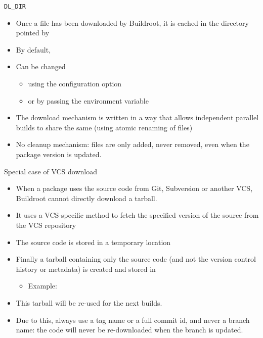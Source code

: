 \begin{frame}{{\tt DL\_DIR}}
  \begin{itemize}
  \item Once a file has been downloaded by Buildroot, it is cached in
    the directory pointed by 
  \item By default, 
  \item Can be changed
    \begin{itemize}
    \item using the  configuration option
    \item or by passing the  environment variable
    \end{itemize}
  \item The download mechanism is written in a way that allows
    independent parallel builds to share the same  (using
    atomic renaming of files)
  \item No cleanup mechanism: files are only added, never removed,
    even when the package version is updated.
  \end{itemize}
\end{frame}

\begin{frame}{Special case of VCS download}
  \begin{itemize}
  \item When a package uses the source code from Git, Subversion or
    another VCS, Buildroot cannot directly download a tarball.
  \item It uses a VCS-specific method to fetch the specified version
    of the source from the VCS repository
  \item The source code is stored in a temporary location
  \item Finally a tarball containing only the source code (and not the
    version control history or metadata) is created and stored in
    \begin{itemize}
    \item Example: 
    \end{itemize}
  \item This tarball will be re-used for the next builds.
  \item Due to this, always use a tag name or a full commit id, and
    never a branch name: the code will never be re-downloaded when the
    branch is updated.
  \end{itemize}
\end{frame}

